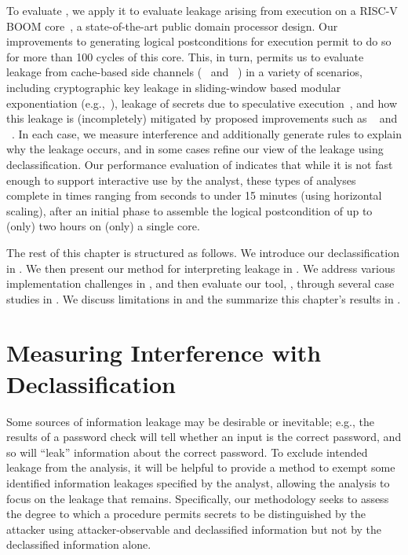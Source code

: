 To evaluate \thirdsysname, we apply it to evaluate leakage arising from
execution on a RISC-V BOOM core~\cite{celio2017boomv2}, a
state-of-the-art public domain processor design.  Our improvements to
generating logical postconditions for execution permit \thirdsysname to do
so for more than 100 cycles of this core.  This, in turn, permits us
to evaluate leakage from cache-based side channels
(\primeprobe~\cite{osvik2006cache} and
\flushreload~\cite{yarom2014flush}) in a variety of scenarios,
including cryptographic key leakage in sliding-window based modular
exponentiation (e.g.,~\cite{percival2005cache, aciicmez2007icache}),
leakage of secrets due to speculative
execution~\cite{spectre,meltdown}, and how this leakage is
(incompletely) mitigated by proposed improvements such as
\scatterCache~\cite{scatterCache} and
~\cite{phantomCache}.  In each case, we measure
interference and additionally generate rules to
explain why the leakage occurs, and in some cases refine our view of
the leakage using declassification.  Our performance evaluation of
\thirdsysname indicates that while it is not fast enough to support
interactive use by the analyst, these types of analyses complete in
times ranging from seconds to under 15 minutes (using horizontal
scaling), after an initial phase to assemble the logical postcondition
of up to (only) two hours on (only) a single core.

The rest of this chapter is structured as follows.  We introduce our
declassification in .  We then present our method
for interpreting leakage in .  We address
various implementation challenges in , and
then evaluate our tool, \thirdsysname, through several case studies in
.  We discuss limitations in 
and the summarize this chapter's results in .

\section{Measuring Interference with Declassification}
\label{dinome:sec:measure:declass}
Some sources of information leakage may be desirable or inevitable;
e.g., the results of a password check will tell whether an input is
the correct password, and so will ``leak'' information about the
correct password. To exclude intended leakage from the analysis, it
will be helpful to provide a method to exempt some identified
information leakages specified by the analyst, allowing the analysis
to focus on the leakage that remains. Specifically, our methodology
seeks to assess the degree to which a procedure permits secrets to be
distinguished by the attacker using attacker-observable and
declassified information but not by the declassified information
alone.

